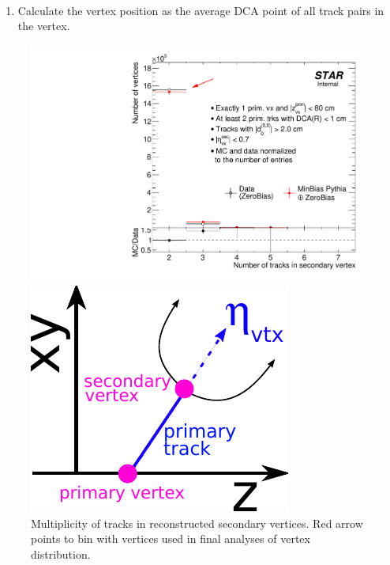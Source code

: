 ~
\begin{enumerate}[resume, before = \vspace*{-23pt}]
 \item Calculate the vertex position as the average DCA point of all track pairs in the vertex.
\end{enumerate}




\begin{figure}[t!]\vspace{-2pt}%
\centering%
\begin{minipage}{.4725\textwidth}%
  \centering%
  \includegraphics[width=\linewidth]{graphics/deadMaterial/NTracksInVertex_DataVsMC.pdf}%
  \caption[Multiplicity of tracks in reconstructed secondary vertices.]{Multiplicity of tracks in reconstructed secondary vertices. Red arrow points to bin with vertices used in final analyses of vertex distribution.}\label{fig:nTrksInSecVx}
\end{minipage}%
\quad\quad%
\begin{minipage}{.4725\textwidth}%
  \centering
  \includegraphics[width=0.9\linewidth]{graphics/deadMaterial/etaVxCut2.pdf}\vspace*{ 15pt}

\end{minipage}
\end{figure}
